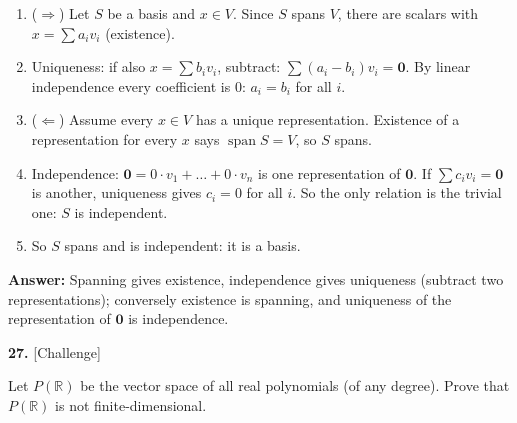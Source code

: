 \documentclass[11pt]{article}
\begin{document}
\begin{tcolorbox}[breakable,colback=ans,colframe=ansb,boxrule=0.5pt,left=4pt,right=4pt,top=2pt,bottom=2pt]\begin{enumerate}[leftmargin=3.1em,itemsep=1pt,topsep=1pt,label=\textbf{Step \arabic*.}]\item ($\Rightarrow$) Let $S$ be a basis and $x\in V$. Since $S$ spans $V$, there are scalars with $x=\sum a_iv_i$ (existence).
\item Uniqueness: if also $x=\sum b_iv_i$, subtract: $\sum(a_i-b_i)v_i=\mathbf 0$. By linear independence every coefficient is $0$: $a_i=b_i$ for all $i$.
\item ($\Leftarrow$) Assume every $x\in V$ has a unique representation. Existence of a representation for every $x$ says $\operatorname{span}S=V$, so $S$ spans.
\item Independence: $\mathbf 0=0\cdot v_1+\dots+0\cdot v_n$ is one representation of $\mathbf 0$. If $\sum c_iv_i=\mathbf 0$ is another, uniqueness gives $c_i=0$ for all $i$. So the only relation is the trivial one: $S$ is independent.
\item So $S$ spans and is independent: it is a basis.
\end{enumerate}\textbf{Answer:} Spanning gives existence, independence gives uniqueness (subtract two representations); conversely existence is spanning, and uniqueness of the representation of $\mathbf 0$ is independence.\end{tcolorbox}
\par\vspace{2pt}
\begin{minipage}{\linewidth}\textbf{27.} \hfill{\scriptsize\color{ink}[Challenge]}\par\nopagebreak Let $P(\mathbb{R})$ be the vector space of all real polynomials (of any degree). Prove that $P(\mathbb{R})$ is not finite-dimensional.
\end{minipage}\par\nopagebreak
\end{document}
